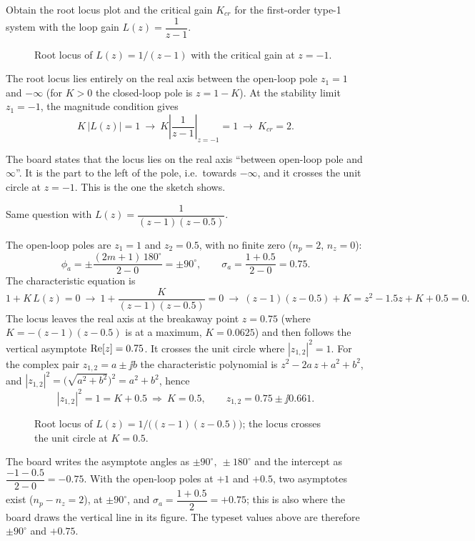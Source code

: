 \begin{example}
Obtain the root locus plot and the critical gain $K_{cr}$ for the first-order type-1 system with the loop gain
$L(z)=\dfrac{1}{z-1}$.

\begin{figure}[H]
\centering
\figRLfirst
\caption{Root locus of $L(z)=1/(z-1)$ with the critical gain at $z=-1$.}
\end{figure}
\noindent The root locus lies entirely on the real axis between the open-loop pole $z_1=1$ and $-\infty$
(for $K>0$ the closed-loop pole is $z=1-K$). At the stability limit $z_1=-1$, the magnitude condition gives
\[
  K\,|L(z)|=1\ \to\ K\left|\frac{1}{z-1}\right|_{z=-1}=1\ \to\ K_{cr}=2.
\]
\end{example}

\begin{boardnote}
The board states that the locus lies on the real axis ``between open-loop pole and $\infty$''. It is the part
to the left of the pole, i.e.\ towards $-\infty$, and it crosses the unit circle at $z=-1$. This is the one
the sketch shows.
\end{boardnote}

\begin{example}
Same question with $L(z)=\dfrac{1}{(z-1)(z-0.5)}$.

The open-loop poles are $z_1=1$ and $z_2=0.5$, with no finite zero ($n_p=2$, $n_z=0$):
\[
  \phi_a=\pm\frac{(2m+1)\,180^{\circ}}{2-0}=\pm90^{\circ},\qquad
  \sigma_a=\frac{1+0.5}{2-0}=0.75.
\]
The characteristic equation is
\[
  1+K\,L(z)=0\ \to\ 1+\frac{K}{(z-1)(z-0.5)}=0\ \to\ (z-1)(z-0.5)+K=z^{2}-1.5z+K+0.5=0.
\]
The locus leaves the real axis at the breakaway point $z=0.75$ (where $K=-(z-1)(z-0.5)$ is at a maximum,
$K=0.0625$) and then follows the vertical asymptote $\operatorname{Re}[z]=0.75$. It crosses the unit circle where
$|z_{1,2}|^{2}=1$. For the complex pair $z_{1,2}=a\pm\jj b$ the characteristic polynomial is
$z^{2}-2a\,z+a^{2}+b^{2}$, and $|z_{1,2}|^{2}=\bigl(\sqrt{a^{2}+b^{2}}\bigr)^{2}=a^{2}+b^{2}$, hence
\[
  |z_{1,2}|^{2}=1=K+0.5\ \Rightarrow\ K=0.5,\qquad z_{1,2}=0.75\pm\jj0.661.
\]
\begin{figure}[H]
\centering
\figRLsecond
\caption{Root locus of $L(z)=1/\bigl((z-1)(z-0.5)\bigr)$; the locus crosses the unit circle at $K=0.5$.}
\end{figure}
\end{example}

\begin{boardnote}
The board writes the asymptote angles as $\pm90^{\circ},\ \pm180^{\circ}$ and the intercept as
$\dfrac{-1-0.5}{2-0}=-0.75$. With the open-loop poles at $+1$ and $+0.5$, two asymptotes exist
($n_p-n_z=2$), at $\pm90^{\circ}$, and $\sigma_a=\dfrac{1+0.5}{2}=+0.75$; this is also where the board draws
the vertical line in its figure. The typeset values above are therefore $\pm90^{\circ}$ and $+0.75$.
\end{boardnote}

